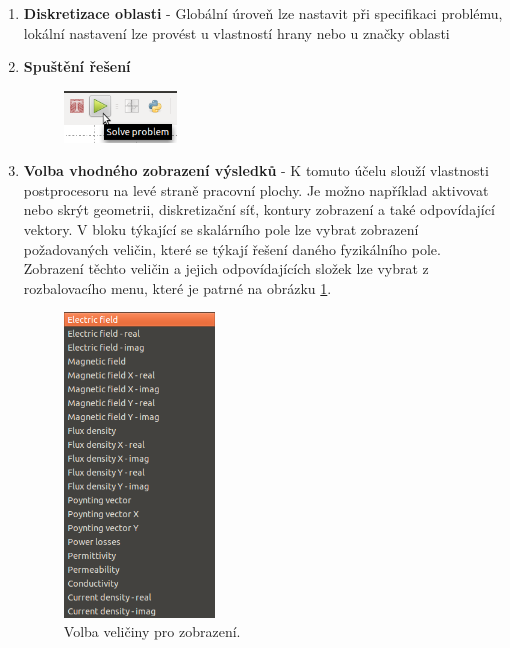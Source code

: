 \begin{enumerate}
\item {\bf Diskretizace oblasti} - Globální úroveň lze nastavit při specifikaci problému, lokální nastavení lze provést u vlastností hrany nebo u značky oblasti 
\item {\bf Spuštění řešení}
\begin{figure}[!h]
	\centering
	\includegraphics[width=3cm]{sim_spusteni_reseni.png}
\end{figure}
\item {\bf Volba vhodného zobrazení výsledků} - K tomuto účelu slouží vlastnosti postprocesoru na levé straně pracovní plochy. Je možno například aktivovat nebo skrýt geometrii, diskretizační síť, kontury zobrazení a také odpovídající vektory. V bloku týkající se skalárního pole lze vybrat zobrazení požadovaných veličin, které se týkají řešení daného fyzikálního pole. Zobrazení těchto veličin a jejich odpovídajících složek lze vybrat z rozbalovacího menu, které je patrné na obrázku \ref{obr:sim_zobrazeni}.
\begin{figure}[!h]
	\centering
	\includegraphics[width=4cm]{sim_zobrazeni.png}
	\caption{Volba veličiny pro zobrazení.}
	\label{obr:sim_zobrazeni}
\end{figure}
\end{enumerate}


